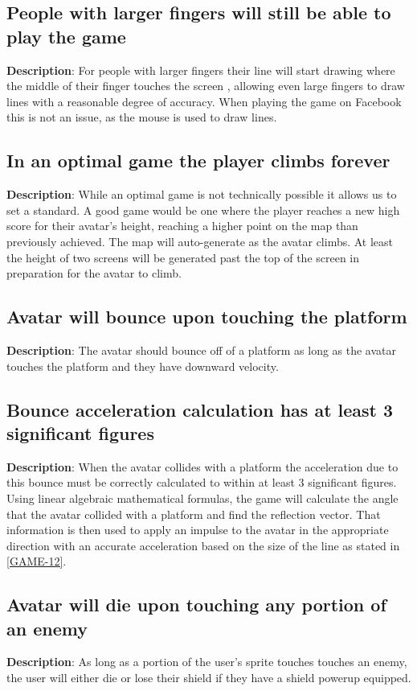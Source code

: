 \subsection{People with larger fingers will still be able to play the game}
\textbf{Description}: For people with larger fingers their line will start
drawing where the middle of their finger touches the screen , allowing
even large fingers to draw lines with a reasonable degree of accuracy.
When playing the game on Facebook this is not an issue, as the mouse
is used to draw lines. 

\subsection{In an optimal game the player climbs forever}
\textbf{Description}: While an optimal game is not technically possible it
allows us to set a standard. A good game would be one where the player
reaches a new high score for their avatar\textquoteright{}s height,
reaching a higher point on the map than previously achieved. The map
will auto-generate as the avatar climbs. At least the height of two
screens will be generated past the top of the screen in preparation
for the avatar to climb.

\subsection{Avatar will bounce upon touching the platform}
\textbf{Description}: The avatar should bounce off of a platform as long as
the avatar touches the platform and they have downward velocity.

\subsection{Bounce acceleration calculation has at least 3 significant figures}
\textbf{Description}: When the avatar collides with a platform the acceleration
due to this bounce must be correctly calculated to within at least
3 significant figures. Using linear algebraic mathematical formulas,
the game will calculate the angle that the avatar collided with a
platform and find the reflection vector. That information is then
used to apply an impulse to the avatar in the appropriate direction
with an accurate acceleration based on the size of the line as stated
in \ref{GAME-12}.

\subsection{Avatar will die upon touching any portion of an enemy}
\textbf{Description}: As long as a portion of the user\textquoteright{}s sprite
touches touches an enemy, the user will either die or lose their shield
if they have a shield powerup equipped.

